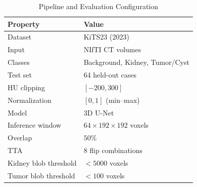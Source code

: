 \begin{table}[!t]
\caption{Pipeline and Evaluation Configuration}
\label{tab:config}
\centering
\begin{tabular}{@{}ll@{}}
\toprule
\textbf{Property} & \textbf{Value} \\
\midrule
Dataset & KiTS23 (2023) \\
Input & NIfTI CT volumes \\
Classes & Background, Kidney, Tumor/Cyst \\
Test set & 64 held-out cases \\
HU clipping & $[-200, 300]$ \\
Normalization & $[0, 1]$ (min--max) \\
Model & 3D U-Net \\
Inference window & $64 \times 192 \times 192$ voxels \\
Overlap & $50\%$ \\
TTA & 8 flip combinations \\
Kidney blob threshold & $< 5000$ voxels \\
Tumor blob threshold & $< 100$ voxels \\
\bottomrule
\end{tabular}
\end{table}
